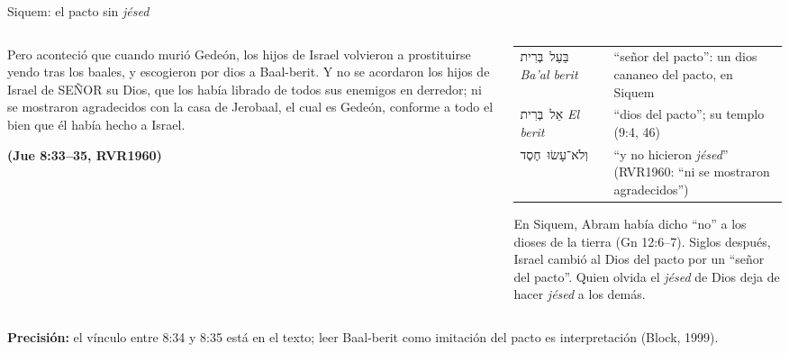 \documentclass[hyperref={bookmarks=false},aspectratio=169]{beamer}
\newcommand{\heb}[1]{\mbox{\foreignlanguage{hebrew}{#1}}}
\newcommand{\SENOR}{S{\fontsize{0.78em}{1em}\selectfont EÑOR}}
\newcommand{\fuente}[1]{\par\hfill{\upshape\bfseries\footnotesize\textcolor{azul}{#1}}}
\newcommand{\precision}[1]{{\footnotesize\color{gris}\textbf{Precisión:} #1}}
\begin{document}
\begin{frame}{Siquem: el pacto sin \emph{jésed}}
\begin{columns}[t,onlytextwidth]
\begin{column}{0.52\textwidth}
\begin{cita}Pero aconteció que cuando murió Gedeón, los hijos de Israel volvieron a prostituirse yendo tras los baales, y escogieron por dios a Baal-berit. Y no se acordaron los hijos de Israel de \SENOR{} su Dios, que los había librado de todos sus enemigos en derredor; ni se mostraron agradecidos con la casa de Jerobaal, el cual es Gedeón, conforme a todo el bien que él había hecho a Israel.\fuente{(Jue 8:33--35, RVR1960)}\end{cita}
\end{column}
\begin{column}{0.46\textwidth}\scriptsize
\renewcommand{\arraystretch}{1.15}
\begin{tabular}{@{}>{\RaggedRight\arraybackslash}p{2.1cm}>{\RaggedRight\arraybackslash}p{3.2cm}@{}}
\toprule
\heb{בַּעַל בְּרִית} \emph{Ba'al berit} & ``señor del pacto'': un dios cananeo del pacto, en Siquem \\
\heb{אֵל בְּרִית} \emph{El berit} & ``dios del pacto''; su templo (9:4, 46) \\
\heb{וְלֹא־עָשׂוּ חֶסֶד} & ``y no hicieron \emph{jésed}'' (RVR1960: ``ni se mostraron agradecidos'') \\
\bottomrule
\end{tabular}\par\medskip
\small En Siquem, Abram había dicho ``no'' a los dioses de la tierra (Gn 12:6--7). Siglos después, Israel cambió al Dios del pacto por un ``señor del pacto''. Quien olvida el \emph{jésed} de Dios deja de hacer \emph{jésed} a los demás.
\end{column}
\end{columns}
\precision{el vínculo entre 8:34 y 8:35 está en el texto; leer Baal-berit como imitación del pacto es interpretación (Block, 1999).}
\end{frame}
\end{document}

